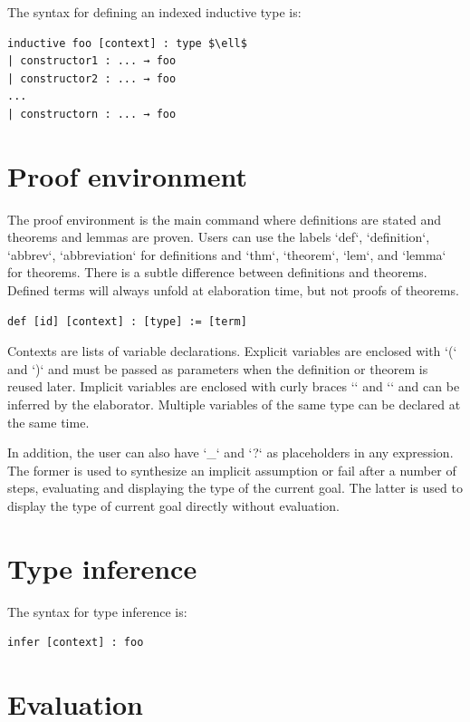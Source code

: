 \documentclass[a4paper]{article}
\begin{document}
The syntax for defining an indexed inductive type is:

\begin{lstlisting}[style=pearl]
inductive foo [context] : type $\ell$
| constructor1 : ... → foo
| constructor2 : ... → foo
...
| constructorn : ... → foo
\end{lstlisting}



\section{Proof environment}

The proof environment is the main command where definitions are stated and theorems and lemmas are proven. Users can use the labels `def`, `definition`, `abbrev`, `abbreviation` for definitions and `thm`, `theorem`, `lem`, and `lemma` for theorems. There is a subtle difference between definitions and theorems. Defined terms will always unfold at elaboration time, but not proofs of theorems. 


\begin{lstlisting}[style=pearl]
def [id] [context] : [type] := [term]
\end{lstlisting}


Contexts are lists of variable declarations. Explicit variables are enclosed with `(` and `)` and must be passed as parameters when the definition or theorem is reused later. Implicit variables are enclosed with curly braces `{` and `}` and can be inferred by the elaborator. Multiple variables of the same type can be declared at the same time.

In addition, the user can also have `\_` and `?` as placeholders in any expression. The former is used to synthesize an implicit assumption or fail after a number of steps, evaluating and displaying the type of the current goal. The latter is used to display the type of current goal directly without evaluation.

\section{Type inference}

The syntax for type inference is:

\begin{lstlisting}[style=pearl]
infer [context] : foo
\end{lstlisting}

\section{Evaluation}
\end{document}
